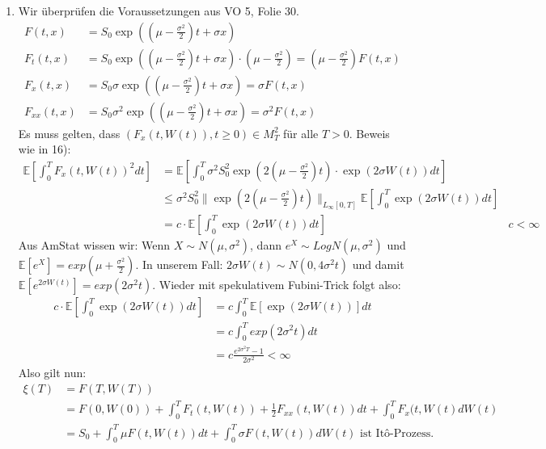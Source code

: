 \documentclass[a4paper,11pt,notitlepage,fullpage]{article}
\newcommand{\Ee}[1]{\mathbb E\left[#1\right]}
\begin{document}
\begin{enumerate}
\item Wir überprüfen die Voraussetzungen aus VO 5, Folie 30.
\begin{align*}
F(t, x) &= S_0 \exp\left(\left(\mu - \frac{\sigma^2}{2}\right)t + \sigma x\right) \\
F_t(t, x) &= S_0 \exp\left(\left(\mu - \frac{\sigma^2}{2}\right)t + \sigma x\right) \cdot \left(\mu - \frac{\sigma^2}{2}\right) = \left(\mu - \frac{\sigma^2}{2}\right) F(t, x)\\
F_x(t, x) &= S_0 \sigma \exp\left(\left(\mu - \frac{\sigma^2}{2}\right)t + \sigma x\right) = \sigma F(t, x) \\
F_{xx}(t, x) &= S_0 \sigma^2 \exp\left(\left(\mu - \frac{\sigma^2}{2}\right)t + \sigma x\right) = \sigma^2 F(t, x)
\end{align*}
Es muss gelten, dass $(F_x(t, W(t)), t \geq 0) \in M_T^2$ für alle $T > 0$. Beweis wie in 16):
\begin{align*}
\Ee{\int_0^T F_x(t, W(t))^2 dt} &= \Ee{\int_0^T \sigma^2 S_0^2 \exp(2(\mu - \frac{\sigma^2}{2}) t) \cdot \exp(2\sigma W(t)) dt} \\
&\leq  \sigma^2 S_0^2 \|\exp(2(\mu - \frac{\sigma^2}{2}) t)\|_{L_\infty[0, T]} \Ee{\int _0^T \exp(2\sigma W(t)) dt} \\
&= c \cdot \Ee{\int _0^T \exp(2\sigma W(t)) dt} &c < \infty
\end{align*}
Aus AmStat wissen wir: Wenn $X\sim N(\mu, \sigma^2)$, dann $e^X \sim LogN(\mu, \sigma^2)$ und $\Ee{e^X} = exp(\mu + \frac{\sigma^2}{2})$. In unserem Fall: $2\sigma W(t) \sim N(0, 4\sigma^2 t)$ und damit $\Ee{e^{2\sigma W(t)}} =  exp(2\sigma^2 t)$. Wieder mit spekulativem Fubini-Trick folgt also:
\begin{align*}
c \cdot \Ee{\int _0^T \exp(2\sigma W(t)) dt} &= c \int _0^T \Ee{\exp(2\sigma W(t))} dt \\
&= c \int _0^T exp(2\sigma^2 t) dt \\
&= c \frac{e^{2\sigma^2 T}-1}{2\sigma^2} < \infty
\end{align*}
Also gilt nun:
\begin{align*}
\xi(T) &= F(T, W(T)) \\
&= F(0, W(0)) + \int_0^T F_t(t, W(t)) + \frac{1}{2} F_{xx}(t, W(t)) dt + \int_0^T F_x(t, W(t) dW(t) \\
&= S_0 + \int_0^T \mu F(t, W(t)) dt + \int_0^T \sigma F(t, W(t)) dW(t) \text{ ist Itô-Prozess.}
\end{align*}





\end{enumerate}
\end{document}
